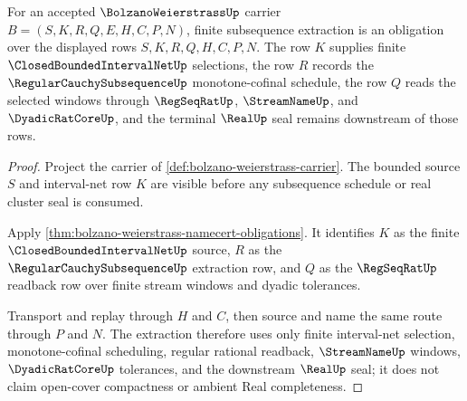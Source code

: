\begin{theorem}
\label{thm:bolzano-weierstrass-finite-subsequence-obligations}
For an accepted $\BolzanoWeierstrassUp$ carrier $B=(S,K,R,Q,E,H,C,P,N)$, finite subsequence extraction is an obligation over the displayed rows $S,K,R,Q,H,C,P,N$. The row $K$ supplies finite $\ClosedBoundedIntervalNetUp$ selections, the row $R$ records the $\RegularCauchySubsequenceUp$ monotone-cofinal schedule, the row $Q$ reads the selected windows through $\RegSeqRatUp$, $\StreamNameUp$, and $\DyadicRatCoreUp$, and the terminal $\RealUp$ seal remains downstream of those rows.
\end{theorem}
\begin{proof}
Project the carrier of \autoref{def:bolzano-weierstrass-carrier}. The bounded source $S$ and interval-net row $K$ are visible before any subsequence schedule or real cluster seal is consumed.

Apply \autoref{thm:bolzano-weierstrass-namecert-obligations}. It identifies $K$ as the finite $\ClosedBoundedIntervalNetUp$ source, $R$ as the $\RegularCauchySubsequenceUp$ extraction row, and $Q$ as the $\RegSeqRatUp$ readback row over finite stream windows and dyadic tolerances.

Transport and replay through $H$ and $C$, then source and name the same route through $P$ and $N$. The extraction therefore uses only finite interval-net selection, monotone-cofinal scheduling, regular rational readback, $\StreamNameUp$ windows, $\DyadicRatCoreUp$ tolerances, and the downstream $\RealUp$ seal; it does not claim open-cover compactness or ambient Real completeness.
\end{proof}

